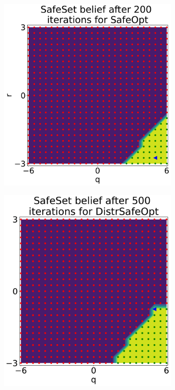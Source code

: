 \begin{figure}[h!]
	\centering
	\hspace*{-5.6em}
	\begin{subfigure}{0.32\textwidth}
		\includegraphics[scale=0.25]{figures/results/robot-sbo-safeset-200.pdf}
		\caption{}
		\label{fig:safeopt-safeset}
	\end{subfigure}
	\hspace*{2.2em}
	\begin{subfigure}{0.32\textwidth}
		\includegraphics[scale=0.25]{figures/results/robot-dbo-safeset-500.pdf}

\end{subfigure}
\end{figure}
